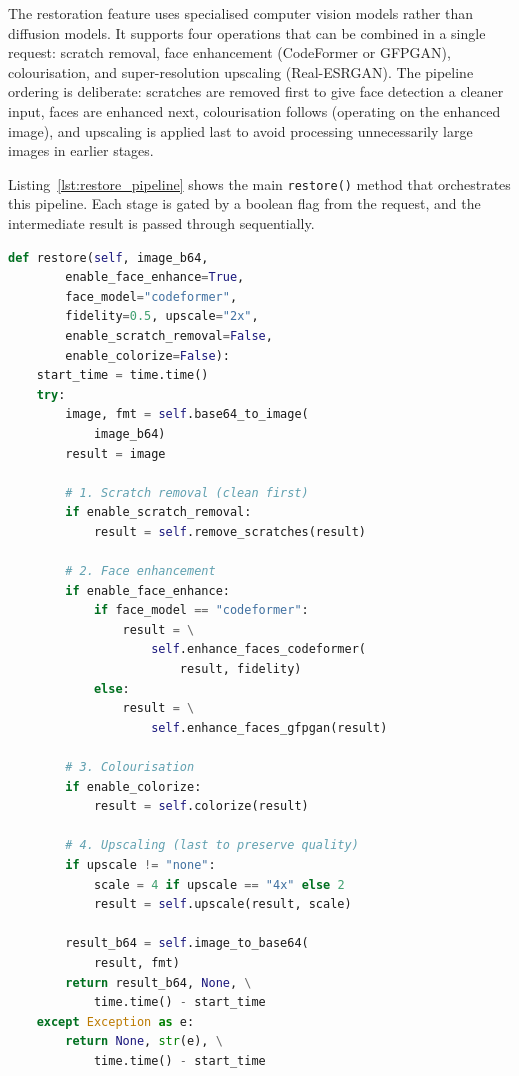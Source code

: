 \documentclass[12pt,a4paper]{report}
\begin{document}
The restoration feature uses specialised computer vision models rather than diffusion models. It supports four operations that can be combined in a single request: scratch removal, face enhancement (Code\-Former or GFPGAN), colourisation, and super-resolution upscaling (Real-ESRGAN). The pipeline ordering is deliberate: scratches are removed first to give face detection a cleaner input, faces are enhanced next, colourisation follows (operating on the enhanced image), and upscaling is applied last to avoid processing unnecessarily large images in earlier stages.

Listing~\ref{lst:restore_pipeline} shows the main \texttt{restore()} method that orchestrates this pipeline. Each stage is gated by a boolean flag from the request, and the intermediate result is passed through sequentially.

\begin{lstlisting}[language=Python, caption={Restoration pipeline orchestration (\texttt{restoration.py})}, label={lst:restore_pipeline}]
def restore(self, image_b64,
        enable_face_enhance=True,
        face_model="codeformer",
        fidelity=0.5, upscale="2x",
        enable_scratch_removal=False,
        enable_colorize=False):
    start_time = time.time()
    try:
        image, fmt = self.base64_to_image(
            image_b64)
        result = image

        # 1. Scratch removal (clean first)
        if enable_scratch_removal:
            result = self.remove_scratches(result)

        # 2. Face enhancement
        if enable_face_enhance:
            if face_model == "codeformer":
                result = \
                    self.enhance_faces_codeformer(
                        result, fidelity)
            else:
                result = \
                    self.enhance_faces_gfpgan(result)

        # 3. Colourisation
        if enable_colorize:
            result = self.colorize(result)

        # 4. Upscaling (last to preserve quality)
        if upscale != "none":
            scale = 4 if upscale == "4x" else 2
            result = self.upscale(result, scale)

        result_b64 = self.image_to_base64(
            result, fmt)
        return result_b64, None, \
            time.time() - start_time
    except Exception as e:
        return None, str(e), \
            time.time() - start_time
\end{lstlisting}
\end{document}
